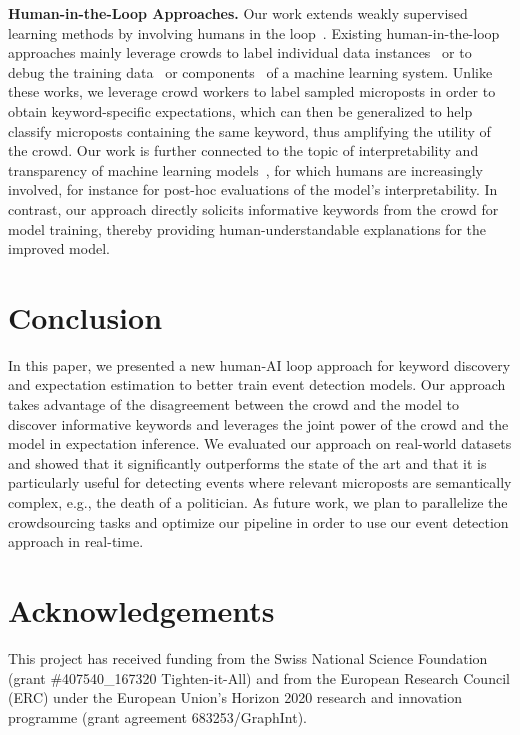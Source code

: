 \documentclass[letterpaper]{article}
\begin{document}
\smallskip
\noindent\textbf{Human-in-the-Loop Approaches.} Our work extends weakly supervised learning methods by involving humans in the loop~\cite{vaughan2017making}. Existing human-in-the-loop approaches mainly leverage crowds to label individual data instances~\cite{yan2011active,yang2018leveraging} or to debug the training data~\cite{krishnan2016activeclean,yang2019scalpel} or components~\cite{parikh2011human,mottaghi2013analyzing,nushi2017human} of a machine learning system. Unlike these works, we leverage crowd workers to label sampled microposts in order to obtain keyword-specific expectations, which can then be generalized to help classify microposts containing the same keyword, thus amplifying the utility of the crowd. Our work is further connected to the topic of interpretability and transparency of machine learning models~\cite{ribeiro2016should,lipton2016mythos,doshi2017towards}, for which humans are increasingly involved, for instance for post-hoc evaluations of the model's interpretability. In contrast, our approach directly solicits informative keywords from the crowd for model training, thereby providing human-understandable explanations for the improved model.

\section{Conclusion}
\label{sec:conclusion}

In this paper, we presented a new human-AI loop approach for keyword discovery and expectation estimation to better train event detection models. Our approach takes advantage of the disagreement between the crowd and the model to discover informative keywords and leverages the joint power of the crowd and the model in expectation inference. We evaluated our approach on real-world datasets and showed that it significantly outperforms the state of the art and that it is particularly useful for detecting events where relevant microposts are semantically complex, e.g., the death of a politician. As future work, we plan to parallelize the crowdsourcing tasks and optimize our pipeline in order to use our event detection approach in real-time.

\section{Acknowledgements}
This project has received funding from the Swiss National Science Foundation (grant \#407540\_167320 Tighten-it-All) and from the European Research Council (ERC) under the European Union's Horizon 2020 research and innovation programme (grant agreement 683253/GraphInt).
\end{document}
